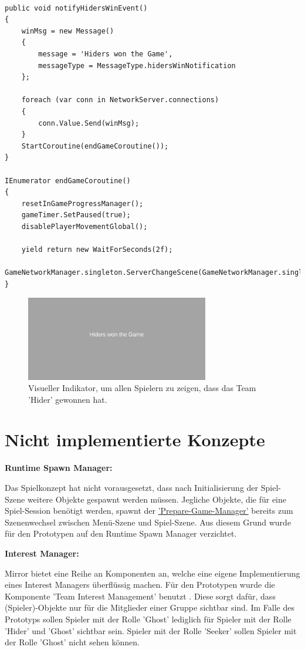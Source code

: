 \begin{lstlisting}[caption= InGameProgressManager.cs Win Event]
	
public void notifyHidersWinEvent()
{
	winMsg = new Message()
	{
		message = 'Hiders won the Game',
		messageType = MessageType.hidersWinNotification
	};
		
	foreach (var conn in NetworkServer.connections)
	{
		conn.Value.Send(winMsg);
	}	
	StartCoroutine(endGameCoroutine());
}

IEnumerator endGameCoroutine()
{
	resetInGameProgressManager();
	gameTimer.SetPaused(true);
	disablePlayerMovementGlobal();
	
	yield return new WaitForSeconds(2f);
	GameNetworkManager.singleton.ServerChangeScene(GameNetworkManager.singleton.offlineScene);
}

\end{lstlisting}

\begin{figure}[H]
	\centering
	\includegraphics[width=80mm]{images/prototyp_hiders_won.png}
	\caption[Hiders won the game]{Visueller Indikator, um allen Spielern zu zeigen, dass das Team 'Hider' gewonnen hat.}
	\label{pic:prototyp_hiders_won}
\end{figure}

\section{Nicht implementierte Konzepte}
\textbf{Runtime Spawn Manager:}

Das Spielkonzept hat nicht vorausgesetzt, dass nach Initialisierung der Spiel-Szene weitere Objekte gespawnt werden müssen. Jegliche Objekte, die für eine Spiel-Session benötigt werden, spawnt der \hyperref[Implementierung:prepare_game_manager]{'Prepare-Game-Manager'} bereits zum Szenenwechsel zwischen Menü-Szene und Spiel-Szene. Aus diesem Grund wurde für den Prototypen auf den Runtime Spawn Manager verzichtet.

\textbf{Interest Manager:}

Mirror bietet eine Reihe an Komponenten an, welche eine eigene Implementierung eines Interest Managers überflüssig machen. Für den Prototypen wurde die Komponente 'Team Interest Management' benutzt \cite{.17.02.2022b}. Diese sorgt dafür, dass (Spieler)-Objekte nur für die Mitglieder einer Gruppe sichtbar sind. Im Falle des Prototyps sollen Spieler mit der Rolle 'Ghost' lediglich für Spieler mit der Rolle 'Hider' und 'Ghost' sichtbar sein. Spieler mit der Rolle 'Seeker' sollen Spieler mit der Rolle 'Ghost' nicht sehen können.

